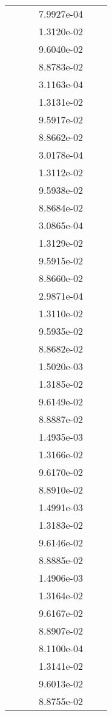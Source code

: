 \begin{xltabular}{\textwidth}{r|rS[table-format=1.3e+2]S[table-format=1.4e+2]S[table-format=1.4e+2]S[table-format=-1.5]}
&  &  & 7.9927e-04 & & \\
&  &  & 1.3120e-02 & & \\
&  &  & 9.6040e-02 & & \\
&  &  & 8.8783e-02 & & \\
&  &  & 3.1163e-04 & & \\
&  &  & 1.3131e-02 & & \\
&  &  & 9.5917e-02 & & \\
&  &  & 8.8662e-02 & & \\
&  &  & 3.0178e-04 & & \\
&  &  & 1.3112e-02 & & \\
&  &  & 9.5938e-02 & & \\
&  &  & 8.8684e-02 & & \\
&  &  & 3.0865e-04 & & \\
&  &  & 1.3129e-02 & & \\
&  &  & 9.5915e-02 & & \\
&  &  & 8.8660e-02 & & \\
&  &  & 2.9871e-04 & & \\
&  &  & 1.3110e-02 & & \\
&  &  & 9.5935e-02 & & \\
&  &  & 8.8682e-02 & & \\
&  &  & 1.5020e-03 & & \\
&  &  & 1.3185e-02 & & \\
&  &  & 9.6149e-02 & & \\
&  &  & 8.8887e-02 & & \\
&  &  & 1.4935e-03 & & \\
&  &  & 1.3166e-02 & & \\
&  &  & 9.6170e-02 & & \\
&  &  & 8.8910e-02 & & \\
&  &  & 1.4991e-03 & & \\
&  &  & 1.3183e-02 & & \\
&  &  & 9.6146e-02 & & \\
&  &  & 8.8885e-02 & & \\
&  &  & 1.4906e-03 & & \\
&  &  & 1.3164e-02 & & \\
&  &  & 9.6167e-02 & & \\
&  &  & 8.8907e-02 & & \\
&  &  & 8.1100e-04 & & \\
&  &  & 1.3141e-02 & & \\
&  &  & 9.6013e-02 & & \\
&  &  & 8.8755e-02 & & \\

\end{xltabular}

